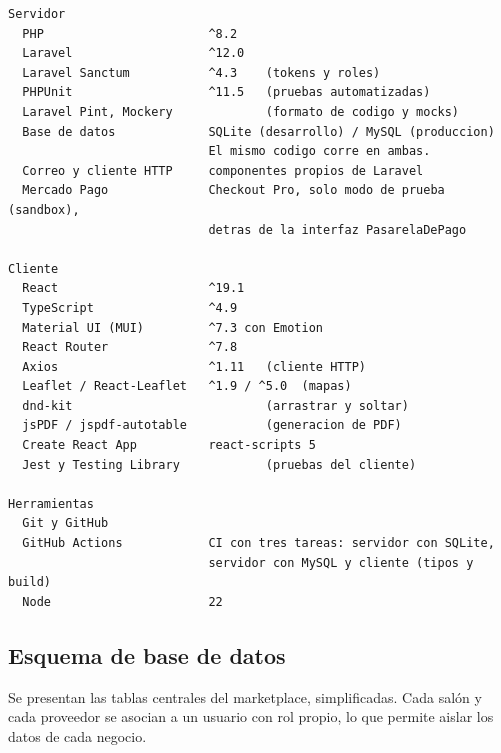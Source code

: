 \begin{lstlisting}[caption={Dependencias principales}, label={lst:dependencias}]
Servidor
  PHP                       ^8.2
  Laravel                   ^12.0
  Laravel Sanctum           ^4.3    (tokens y roles)
  PHPUnit                   ^11.5   (pruebas automatizadas)
  Laravel Pint, Mockery             (formato de codigo y mocks)
  Base de datos             SQLite (desarrollo) / MySQL (produccion)
                            El mismo codigo corre en ambas.
  Correo y cliente HTTP     componentes propios de Laravel
  Mercado Pago              Checkout Pro, solo modo de prueba (sandbox),
                            detras de la interfaz PasarelaDePago

Cliente
  React                     ^19.1
  TypeScript                ^4.9
  Material UI (MUI)         ^7.3 con Emotion
  React Router              ^7.8
  Axios                     ^1.11   (cliente HTTP)
  Leaflet / React-Leaflet   ^1.9 / ^5.0  (mapas)
  dnd-kit                           (arrastrar y soltar)
  jsPDF / jspdf-autotable           (generacion de PDF)
  Create React App          react-scripts 5
  Jest y Testing Library            (pruebas del cliente)

Herramientas
  Git y GitHub
  GitHub Actions            CI con tres tareas: servidor con SQLite,
                            servidor con MySQL y cliente (tipos y build)
  Node                      22
\end{lstlisting}

\subsection{Esquema de base de datos}

Se presentan las tablas centrales del marketplace, simplificadas. Cada
salón y cada proveedor se asocian a un usuario con rol propio, lo que
permite aislar los datos de cada negocio.

